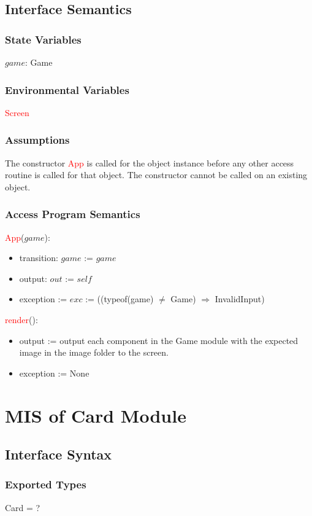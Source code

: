 \documentclass[12pt, titlepage]{article}
\begin{document}
\subsection{Interface Semantics}
\subsubsection{State Variables}
$game$: Game

\subsubsection{Environmental Variables}
\textcolor{red}{Screen}
\subsubsection{Assumptions}
The constructor \textcolor{red}{App} is called for the object instance before any other access routine is called for that object. The constructor cannot be called on an existing object.

\subsubsection{Access Program Semantics}
\textcolor{red}{App}($game$):
\begin{itemize}
    \item transition: $game$ := $game$
    \item output: $out$ := $self$
    \item exception := $exc$ := ((typeof(game) $\neq$ Game) $\Rightarrow$ InvalidInput)
\end{itemize}

\textcolor{red}{render}():
\begin{itemize}
    \item output := output each component in the Game module with the expected image in the image folder to the screen.
    \item exception := None
\end{itemize}

\section{MIS of Card Module}
\subsection{Interface Syntax}
\subsubsection{Exported Types}
Card = ?
\end{document}
